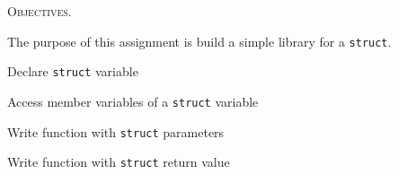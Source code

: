 
\textsc{Objectives.}
\begin{tightlist}
\item The purpose of this assignment is build a simple library for a
\texttt{struct}. 
\item Declare \texttt{struct} variable
\item Access member variables of a \texttt{struct} variable
\item Write function with \texttt{struct} parameters 
\item Write function with \texttt{struct} return value
\end{tightlist}
